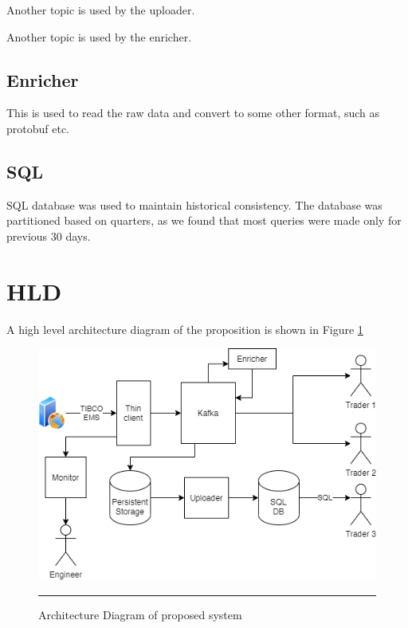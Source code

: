 Another topic is used by the uploader.

Another topic is used by the enricher.

\subsection{Enricher}
This is used to read the raw data and convert to some other format, such as protobuf etc.

\subsection{SQL}
SQL database was used to maintain historical consistency. The database was partitioned based on quarters, as we found that most queries were made only for previous 30 days.

\section{HLD}
A high level architecture diagram of the proposition is shown in Figure \ref{fig:Architecture Diagram}

\begin{figure}[htbp]
	\centering
	\includegraphics[width=1.0\columnwidth]{Figures/ArchitectureDiagram.png}
	\rule{35em}{0.5pt}
	\caption[Architecture Diagram]{Architecture Diagram of proposed system}
	\label{fig:Architecture Diagram}
\end{figure}

